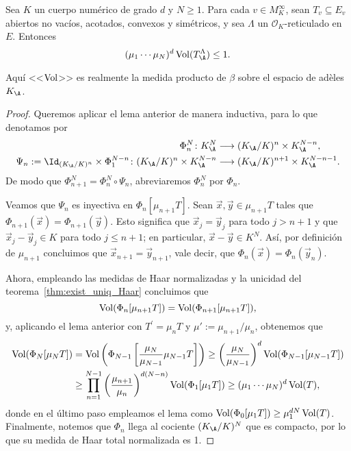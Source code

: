 \documentclass[teoria-numeros.tex]{subfiles}
\begin{document}
\begin{thm}
	Sea $K$ un cuerpo numérico de grado $d$ y $N \ge 1$.
	Para cada $v \in M_K^\infty$, sean $T_v \subseteq E_v$ abiertos no vacíos, acotados, convexos y simétricos,
	y sea $\Lambda$ un $\mathcal{O}_K$-reticulado en $E$.
	Entonces
	$$ (\mu_1 \cdots \mu_N)^d \Vol(T_\A^\Lambda) \le 1. $$
\end{thm}
Aquí <<$\operatorname{Vol}$>> es realmente la medida producto de $\beta$ sobre el espacio de adèles $K_\A$.
\begin{proof}
	Queremos aplicar el lema anterior de manera inductiva, para lo que denotamos por
	\begin{align*}
		\Phi^N_n \colon K_\A^N &\longrightarrow (K_\A/K)^n \times K_\A^{N-n}, \\
		\Psi_n := \Id_{(K_\A/K)^n} \times \Phi^{N-n}_1 \colon (K_\A/K)^n \times K_\A^{N-n} &\longrightarrow (K_\A/K)^{n+1} \times K_\A^{N-n-1}.
	\end{align*}
	De modo que $\Phi^N_{n+1} = \Phi_n^N \circ \Psi_n$, abreviaremos $\Phi^N_n$ por $\Phi_n$.

	Veamos que $\Psi_n$ es inyectiva en $\Phi_n[\mu_{n+1}T]$.
	Sean $\vec x, \vec y \in \mu_{n+1}T$ tales que $\Phi_{n+1}(\vec x) = \Phi_{n+1}(\vec y)$.
	Esto significa que $\vec x_j = \vec y_j$ para todo $j > n+1$ y que $\vec x_j - \vec y_j \in K$ para todo $j \le n+1$;
	en particular, $\vec x - \vec y \in K^N$.
	Así, por definición de $\mu_{n+1}$ concluimos que $\vec x_{n+1} = \vec y_{n+1}$, vale decir, que $\Phi_n(\vec x) = \Phi_n(\vec y_n)$.

	Ahora, empleando las medidas de Haar normalizadas y la unicidad del teorema~\ref{thm:exist_uniq_Haar} concluimos que
	$$ \operatorname{Vol}( \Phi_n[\mu_{n+1}T] ) = \operatorname{Vol}( \Phi_{n+1}[\mu_{n+1}T] ), $$
	y, aplicando el lema anterior con $T^\prime = \mu_nT$ y $\mu' := \mu_{n+1}/\mu_n$, obtenemos que
	\begin{align*}
		\operatorname{Vol}( \Phi_N[\mu_N T] ) &= \operatorname{Vol}\left( \Phi_{N-1}\left[ \frac{\mu_N}{\mu_{N-1}} \mu_{N-1} T \right] \right) \ge
		\left( \frac{ \mu_N}{\mu_{N-1}} \right)^d \operatorname{Vol}( \Phi_{N-1}[ \mu_{N-1}T ] ) \\
					&\ge \prod_{n=1}^{N-1} \left( \frac{\mu_{n+1}}{ \mu_n} \right)^{d(N-n)} \operatorname{Vol}( \Phi_1[ \mu_1T ] )
					\ge (\mu_1 \cdots \mu_N)^d \operatorname{Vol}(T),
	\end{align*}
	donde en el último paso empleamos el lema como $\operatorname{Vol}( \Phi_0[ \mu_1T ] ) \ge \mu_1^{dN} \operatorname{Vol}(T)$.
	Finalmente, notemos que $\Phi_n$ llega al cociente $(K_\A/K)^N$ que es compacto, por lo que su medida de Haar total normalizada es 1.
\end{proof}
\end{document}
